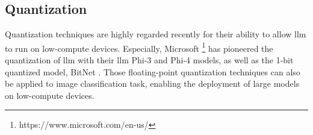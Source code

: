 \subsection{Quantization}
\label{sec:rw:quantization}

Quantization techniques are highly regarded recently for their ability
to allow \gls*{llm} to run on low-compute devices.
Especially, Microsoft \footnote{https://www.microsoft.com/en-us/} has pioneered the quantization of \gls*{llm}
with their \gls*{llm} Phi-3 \cite{microsoft_phi3} and Phi-4 \cite{microsoft_phi4} models,
as well as the 1-bit quantized model, BitNet \cite{microsoft_bitnet}.
Those floating-point quantization techniques can also be applied to image classification task,
enabling the deployment of large models on low-compute devices.